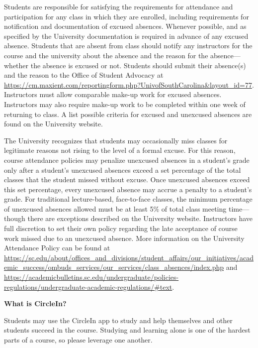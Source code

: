 \documentclass[11pt,letterpaper]{article}
\begin{document}
Students are responsible for satisfying the requirements for attendance and participation for any class in which they are enrolled, including requirements for notification and documentation of excused absences. Whenever possible, and as specified by the University documentation is required in advance of any excused absence. Students that are absent from class should notify any instructors for the course and the university about the absence and the reason for the absence---whether the absence is excused or not. Students should submit their absence(s) and the reason to the Office of Student Advocacy at \url{https://cm.maxient.com/reportingform.php?UnivofSouthCarolina\&layout_id=77}. Instructors must allow comparable make-up work for excused absences. Instructors may also require make-up work to be completed within one week of returning to class. A list possible criteria for excused and unexcused absences are found on the University website. \pspace





\newpage





The University recognizes that students may occasionally miss classes for legitimate reasons not rising to the level of a formal excuse. For this reason, course attendance policies may penalize unexcused absences in a student's grade only after a student's unexcused absences exceed a set percentage of the total classes that the student missed without excuse. Once unexcused absences exceed this set percentage, every unexcused absence may accrue a penalty to a student’s grade. For traditional lecture-based, face-to-face classes, the minimum percentage of unexcused absences allowed must be at least 5\% of total class meeting time---though there are exceptions described on the University website. Instructors have full discretion to set their own policy regarding the late acceptance of course work missed due to an unexcused absence. More information on the University Attendance Policy can be found at \url{https://sc.edu/about/offices_and_divisions/student_affairs/our_initiatives/academic_success/ombuds_services/our_services/class_absences/index.php} and \url{https://academicbulletins.sc.edu/undergraduate/policies-regulations/undergraduate-academic-regulations/\#text}. 
\sectionbreak




{\bfseries What is CircleIn?} \par
Students may use the CircleIn app to study and help themselves and other students succeed in the course. Studying and learning alone is one of the hardest parts of a course, so please leverage one another. \par\vspace{0.3cm}
\end{document}
